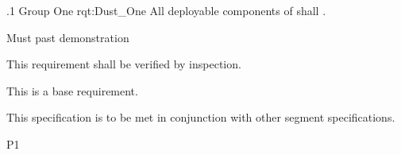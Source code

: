 \ONERQMTVKSA
{\RqtNumberBase.1}
{Group One}
{rqt:Dust_One}
{All deployable components of \ThisSys shall \TBD.}
{
	\item [Phase 1] Must past demonstration
}
{This requirement shall be verified by inspection.}
{
\item [N/A] This is a base requirement.
}
{
	\item This specification is to be met in conjunction with other segment specifications.
}
{P1}

